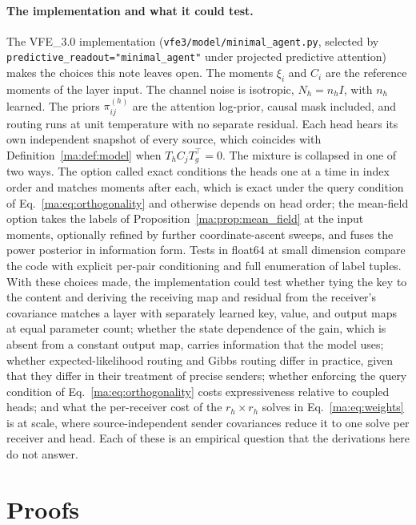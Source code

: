 \documentclass[11pt]{article}
\theoremstyle{definition}
\theoremstyle{remark}
\begin{document}
\paragraph{The implementation and what it could test.}
The VFE\_3.0 implementation (\texttt{vfe3/model/minimal\_agent.py}, selected by \texttt{predictive\_readout="minimal\_agent"} under projected predictive attention) makes the choices this note leaves open. The moments $\xi_i$ and $C_i$ are the reference moments of the layer input. The channel noise is isotropic, $N_h=n_hI$, with $n_h$ learned. The priors $\pi^{(h)}_{ij}$ are the attention log-prior, causal mask included, and routing runs at unit temperature with no separate residual. Each head hears its own independent snapshot of every source, which coincides with Definition~\ref{ma:def:model} when $T_hC_jT_g^\top=0$. The mixture is collapsed in one of two ways. The option called exact conditions the heads one at a time in index order and matches moments after each, which is exact under the query condition of Eq.~\eqref{ma:eq:orthogonality} and otherwise depends on head order; the mean-field option takes the labels of Proposition~\ref{ma:prop:mean_field} at the input moments, optionally refined by further coordinate-ascent sweeps, and fuses the power posterior in information form. Tests in float64 at small dimension compare the code with explicit per-pair conditioning and full enumeration of label tuples. With these choices made, the implementation could test whether tying the key to the content and deriving the receiving map and residual from the receiver's covariance matches a layer with separately learned key, value, and output maps at equal parameter count; whether the state dependence of the gain, which is absent from a constant output map, carries information that the model uses; whether expected-likelihood routing and Gibbs routing differ in practice, given that they differ in their treatment of precise senders; whether enforcing the query condition of Eq.~\eqref{ma:eq:orthogonality} costs expressiveness relative to coupled heads; and what the per-receiver cost of the $r_h\times r_h$ solves in Eq.~\eqref{ma:eq:weights} is at scale, where source-independent sender covariances reduce it to one solve per receiver and head. Each of these is an empirical question that the derivations here do not answer.

\appendix

\section{Proofs}
\label{ma:app:proofs}
\end{document}
